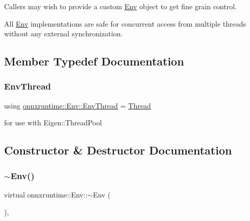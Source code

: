 Callers may wish to provide a custom \mbox{\hyperlink{classonnxruntime_1_1Env}{Env}} object to get fine grain control.

All \mbox{\hyperlink{classonnxruntime_1_1Env}{Env}} implementations are safe for concurrent access from multiple threads without any external synchronization. 

\subsection{Member Typedef Documentation}
\mbox{\label{classonnxruntime_1_1Env_a6bb161baf73e98f7fd274db84e3fb489}} 
\subsubsection{\texorpdfstring{Env\+Thread}{EnvThread}}
{\footnotesize\ttfamily using \mbox{\hyperlink{classonnxruntime_1_1Env_a6bb161baf73e98f7fd274db84e3fb489}{onnxruntime\+::\+Env\+::\+Env\+Thread}} =  \mbox{\hyperlink{classonnxruntime_1_1Thread}{Thread}}}



for use with Eigen\+::\+Thread\+Pool 



\subsection{Constructor \& Destructor Documentation}
\mbox{\label{classonnxruntime_1_1Env_abe66ea0aa527876cb0dadd0a5eeef6d1}} 
\subsubsection{\texorpdfstring{$\sim$\+Env()}{~Env()}}
{\footnotesize\ttfamily virtual onnxruntime\+::\+Env\+::$\sim$\+Env (\begin{DoxyParamCaption}{ }\end{DoxyParamCaption})\hspace{0.3cm}{\ttfamily [virtual]}, {\ttfamily [default]}}

\mbox{\label{classonnxruntime_1_1Env_a678b158e7cd6c0dc196c4695ac482d65}} 
